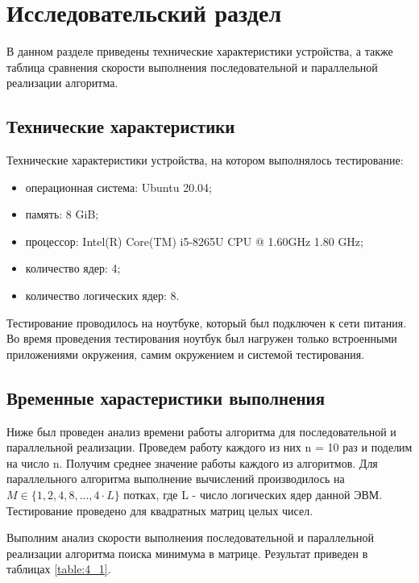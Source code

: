 \chapter{Исследовательский раздел}
В данном разделе приведены технические характеристики устройства, а также таблица сравнения скорости выполнения последовательной и параллельной реализации алгоритма.
 
\section{Технические характеристики}
Технические характеристики устройства, на котором выполнялось тестирование:
\begin{itemize}
	\item операционная система: Ubuntu 20.04;
	\item память: 8 GiB;
	\item процессор: Intel(R) Core(TM) i5-8265U CPU @ 1.60GHz   1.80 GHz;
	\item количество ядер: 4;
	\item количество логических ядер: 8.
\end{itemize}
Тестирование проводилось на ноутбуке, который был подключен к сети питания. Во время проведения тестирования ноутбук был нагружен только встроенными приложениями окружения, самим окружением и системой тестирования.

\section{Временные харастеристики выполнения}
Ниже был проведен анализ времени работы алгоритма для последовательной и параллельной реализации. Проведем работу каждого из них n = 10 раз и поделим на число n. Получим среднее значение работы каждого из алгоритмов. Для параллельного алгоритма выполнение вычислений производилось на $M \in \{1, 2, 4, 8, ... , 4 \cdot L\}$ потках, где L - число логических ядер данной ЭВМ. Тестирование проведено для квадратных матриц целых чисел.

Выполним анализ скорости выполнения последовательной и параллельной реализации алгоритма поиска минимума в матрице. Результат приведен в таблицах \ref{table:4_1}.

